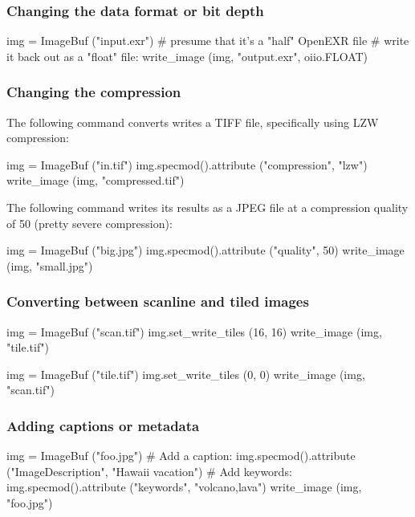 \subsubsection*{Changing the data format or bit depth}

\begin{code}
    img = ImageBuf ("input.exr")
    # presume that it's a "half" OpenEXR file
    # write it back out as a "float" file:
    write_image (img, "output.exr", oiio.FLOAT)
\end{code}


\subsubsection*{Changing the compression}

The following command converts writes a TIFF file, specifically using
LZW compression:

\begin{code}
    img = ImageBuf ("in.tif")
    img.specmod().attribute ("compression", "lzw")
    write_image (img, "compressed.tif")
\end{code}

The following command writes its results as a JPEG file at a 
compression quality of 50 (pretty severe compression):

\begin{code}
    img = ImageBuf ("big.jpg")
    img.specmod().attribute ("quality", 50)
    write_image (img, "small.jpg")
\end{code}


\subsubsection*{Converting between scanline and tiled images}

\begin{code}
    img = ImageBuf ("scan.tif")
    img.set_write_tiles (16, 16)
    write_image (img, "tile.tif")

    img = ImageBuf ("tile.tif")
    img.set_write_tiles (0, 0)
    write_image (img, "scan.tif")
\end{code}


\subsubsection*{Adding captions or metadata}

\begin{code}
    img = ImageBuf ("foo.jpg")
    # Add a caption:
    img.specmod().attribute ("ImageDescription", "Hawaii vacation")
    # Add keywords:
    img.specmod().attribute ("keywords", "volcano,lava")
    write_image (img, "foo.jpg")
\end{code}


